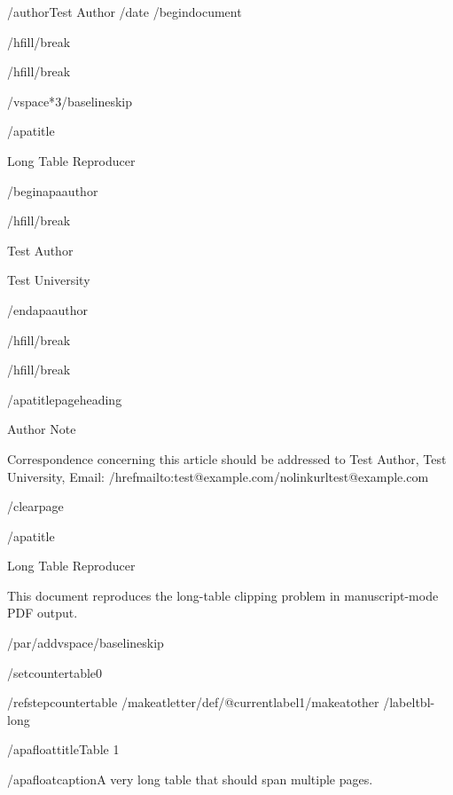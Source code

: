/author{Test Author}
/date{}
/begin{document}


/hfill/break

/hfill/break

/vspace*{3/baselineskip}

/apatitle{

Long Table Reproducer

}

/begin{apaauthor}

/hfill/break

Test Author

Test University

/end{apaauthor}

/hfill/break

/hfill/break

/apatitlepageheading{

Author Note

}

Correspondence concerning this article should be addressed to Test
Author, Test University, Email:
/href{mailto:test@example.com}{/nolinkurl{test@example.com}}

/clearpage

/apatitle{

Long Table Reproducer

}

This document reproduces the long-table clipping problem in
manuscript-mode PDF output.

/par/addvspace{/baselineskip}

/setcounter{table}{0}

/refstepcounter{table}%
/makeatletter/def/@currentlabel{1}/makeatother%
/label{tbl-long}

/apafloattitle{Table 1}

/apafloatcaption{A very long table that should span multiple pages.}

